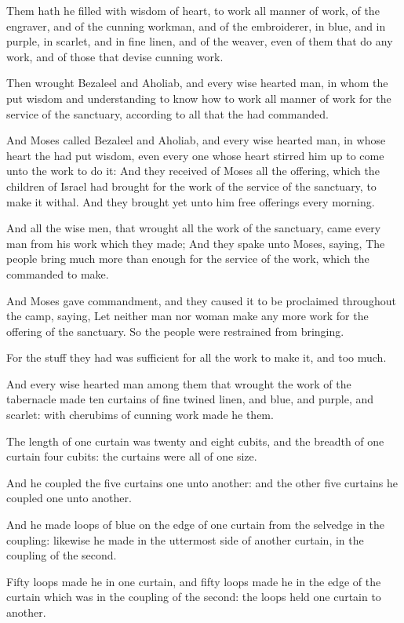 \Verse Them hath he filled with wisdom of heart, to work all manner of work, of the engraver, and of the cunning workman, and of the embroiderer, in blue, and in purple, in scarlet, and in fine linen, and of the weaver, even of them that do any work, and of those that devise cunning work.

\Chapter
\Verse Then wrought Bezaleel and Aholiab, and every wise hearted man, in whom the \LORD put wisdom and understanding to know how to work all manner of work for the service of the sanctuary, according to all that the \LORD had commanded.

\Verse And Moses called Bezaleel and Aholiab, and every wise hearted man, in whose heart the \LORD had put wisdom, even every one whose heart stirred him up to come unto the work to do it: \Verse And they received of Moses all the offering, which the children of Israel had brought for the work of the service of the sanctuary, to make it withal. And they brought yet unto him free offerings every morning.

\Verse And all the wise men, that wrought all the work of the sanctuary, came every man from his work which they made; \Verse And they spake unto Moses, saying, The people bring much more than enough for the service of the work, which the \LORD commanded to make.

\Verse And Moses gave commandment, and they caused it to be proclaimed throughout the camp, saying, Let neither man nor woman make any more work for the offering of the sanctuary. So the people were restrained from bringing.

\Verse For the stuff they had was sufficient for all the work to make it, and too much.

\Verse And every wise hearted man among them that wrought the work of the tabernacle made ten curtains of fine twined linen, and blue, and purple, and scarlet: with cherubims of cunning work made he them.

\Verse The length of one curtain was twenty and eight cubits, and the breadth of one curtain four cubits: the curtains were all of one size.

\Verse And he coupled the five curtains one unto another: and the other five curtains he coupled one unto another.

\Verse And he made loops of blue on the edge of one curtain from the selvedge in the coupling: likewise he made in the uttermost side of another curtain, in the coupling of the second.

\Verse Fifty loops made he in one curtain, and fifty loops made he in the edge of the curtain which was in the coupling of the second: the loops held one curtain to another.

